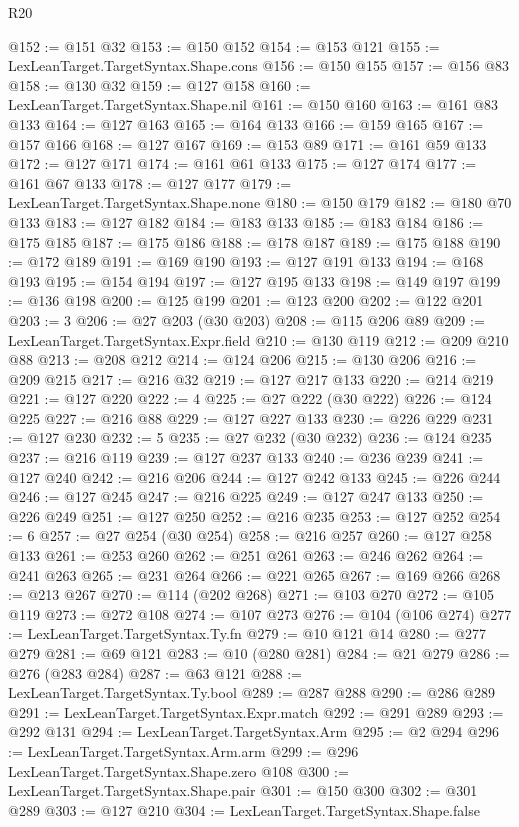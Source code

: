 \begin{lexlean}{R20}
\begin{coremodule}
@152 := @151 @32
@153 := @150 @152
@154 := @153 @121
@155 := LexLeanTarget.TargetSyntax.Shape.cons
@156 := @150 @155
@157 := @156 @83
@158 := @130 @32
@159 := @127 @158
@160 := LexLeanTarget.TargetSyntax.Shape.nil
@161 := @150 @160
@163 := @161 @83 @133
@164 := @127 @163
@165 := @164 @133
@166 := @159 @165
@167 := @157 @166
@168 := @127 @167
@169 := @153 @89
@171 := @161 @59 @133
@172 := @127 @171
@174 := @161 @61 @133
@175 := @127 @174
@177 := @161 @67 @133
@178 := @127 @177
@179 := LexLeanTarget.TargetSyntax.Shape.none
@180 := @150 @179
@182 := @180 @70 @133
@183 := @127 @182
@184 := @183 @133
@185 := @183 @184
@186 := @175 @185
@187 := @175 @186
@188 := @178 @187
@189 := @175 @188
@190 := @172 @189
@191 := @169 @190
@193 := @127 @191 @133
@194 := @168 @193
@195 := @154 @194
@197 := @127 @195 @133
@198 := @149 @197
@199 := @136 @198
@200 := @125 @199
@201 := @123 @200
@202 := @122 @201
@203 := 3
@206 := @27 @203 (@30 @203)
@208 := @115 @206 @89
@209 := LexLeanTarget.TargetSyntax.Expr.field
@210 := @130 @119
@212 := @209 @210 @88
@213 := @208 @212
@214 := @124 @206
@215 := @130 @206
@216 := @209 @215
@217 := @216 @32
@219 := @127 @217 @133
@220 := @214 @219
@221 := @127 @220
@222 := 4
@225 := @27 @222 (@30 @222)
@226 := @124 @225
@227 := @216 @88
@229 := @127 @227 @133
@230 := @226 @229
@231 := @127 @230
@232 := 5
@235 := @27 @232 (@30 @232)
@236 := @124 @235
@237 := @216 @119
@239 := @127 @237 @133
@240 := @236 @239
@241 := @127 @240
@242 := @216 @206
@244 := @127 @242 @133
@245 := @226 @244
@246 := @127 @245
@247 := @216 @225
@249 := @127 @247 @133
@250 := @226 @249
@251 := @127 @250
@252 := @216 @235
@253 := @127 @252
@254 := 6
@257 := @27 @254 (@30 @254)
@258 := @216 @257
@260 := @127 @258 @133
@261 := @253 @260
@262 := @251 @261
@263 := @246 @262
@264 := @241 @263
@265 := @231 @264
@266 := @221 @265
@267 := @169 @266
@268 := @213 @267
@270 := @114 (@202 @268)
@271 := @103 @270
@272 := @105 @119
@273 := @272 @108
@274 := @107 @273
@276 := @104 (@106 @274)
@277 := LexLeanTarget.TargetSyntax.Ty.fn
@279 := @10 @121 @14
@280 := @277 @279
@281 := @69 @121
@283 := @10 (@280 @281)
@284 := @21 @279
@286 := @276 (@283 @284)
@287 := @63 @121
@288 := LexLeanTarget.TargetSyntax.Ty.bool
@289 := @287 @288
@290 := @286 @289
@291 := LexLeanTarget.TargetSyntax.Expr.match
@292 := @291 @289
@293 := @292 @131
@294 := LexLeanTarget.TargetSyntax.Arm
@295 := @2 @294
@296 := LexLeanTarget.TargetSyntax.Arm.arm
@299 := @296 LexLeanTarget.TargetSyntax.Shape.zero @108
@300 := LexLeanTarget.TargetSyntax.Shape.pair
@301 := @150 @300
@302 := @301 @289
@303 := @127 @210
@304 := LexLeanTarget.TargetSyntax.Shape.false

\end{coremodule}
\end{lexlean}
